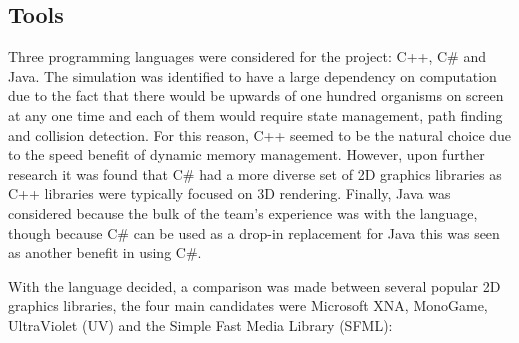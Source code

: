 \documentclass{ueacmpstyle}
\begin{document}
\subsection{Tools}
Three programming languages were considered for the project: C++, C\# and Java. The simulation was identified to have a large dependency on computation due to the fact that there would be upwards of one hundred organisms on screen at any one time and each of them would require state management, path finding and collision detection. For this reason, C++ seemed to be the natural choice due to the speed benefit of dynamic memory management. However, upon further research it was found that C\# had a more diverse set of 2D graphics libraries as C++ libraries were typically focused on 3D rendering. Finally, Java was considered because the bulk of the team's experience was with the language, though because C\# can be used as a drop-in replacement for Java this was seen as another benefit in using C\#.

With the language decided, a comparison was made between several popular 2D graphics libraries, the four main candidates were Microsoft XNA, MonoGame, UltraViolet (UV) and the Simple Fast Media Library (SFML):
\end{document}
